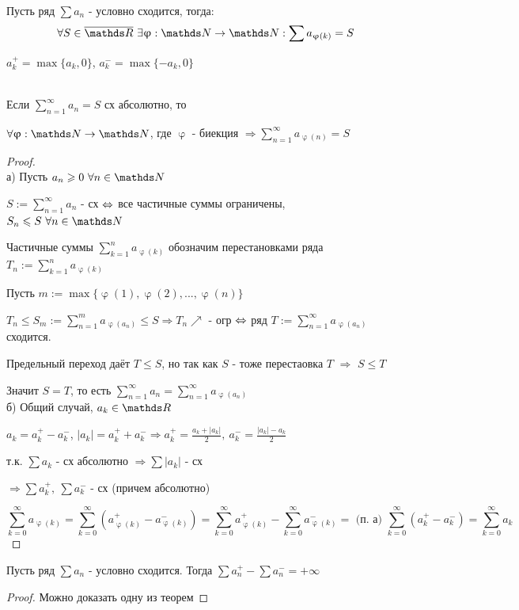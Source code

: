\documentclass[matan]{subfiles}
\begin{document}
  \begin{theorem} [Римана v1] \ \\
      Пусть ряд $\sum a_n$ - условно сходится, тогда:
      \[\forall S \in \overline{\R}\ \e \upvarphi: \N \rightarrow \N: \sum a_{\upvarphi(k)} = S\]
  \end{theorem}

  \begin{definition}
      $a_k^+ = \max\{a_k, 0\}$, $a_k^- = \max\{-a_k, 0\}$
  \end{definition}

  \begin{theorem}  \ \\
      Если $\sum\limits_{n=1}^\infty a_n= S$ сх абсолютно, то

      $\forall \upvarphi: \N \rightarrow \N$, где $\upvarphi$ - биекция $\Rightarrow \sum\limits_{n=1}^\infty a_{\upvarphi(n)} = S$
  \end{theorem}

  \begin{proof}\\
      а) Пусть $a_n \geqslant 0\ \forall n \in \N$

      $S := \sum\limits_{n=1}^\infty a_n$ - сх $\Leftrightarrow$ все частичные суммы ограничены,  $S_n \leqslant S\ \forall n \in \N$

      Частичные суммы $\sum\limits_{k=1}^n a_{\upvarphi(k)}$ обозначим перестановками ряда $T_n := \sum\limits_{k=1}^n a_{\upvarphi(k)}$

      Пусть $m:=\max \{\upvarphi(1), \upvarphi(2), ..., \upvarphi(n) \}$

      $T_n \leqslant S_m := \sum\limits_{n=1}^m a_{\upvarphi(a_n)} \leqslant S \Rightarrow T_n \nearrow$ - огр $\Leftrightarrow$ ряд $T := \sum\limits_{n=1}^\infty a_{\upvarphi(a_n)}$ сходится.

      Предельный переход даёт $T \leqslant S$, но так как $S$ - тоже перестаовка $T$ $\Rightarrow$ $S \leqslant T$

      Значит $S=T$, то есть $\sum\limits_{n=1}^\infty a_n = \sum\limits_{n=1}^\infty a_{\upvarphi(a_n)}$
      \\
      б) Общий случай, $a_k \in \R $

      $a_k = a_k^+ - a_k^-$, $|a_k| = a_k^+ + a_k^- \Rightarrow a_k^+ = \frac{a_k + |a_k|}{2},\ a_k^-=\frac{|a_k|-a_k}{2}$

      т.к. $\sum a_k$ - сх абсолютно $\Rightarrow \sum |a_k|$ - сх

      $\Rightarrow \sum a_k^+,\ \sum a_k^-$ - сх (причем абсолютно)

      $$\sum\limits_{k=0}^\infty a_{\upvarphi(k)} = \sum\limits_{k=0}^\infty (a_{\upvarphi(k)}^+ - a_{\upvarphi(k)}^-) = \sum\limits_{k=0}^\infty a_{\upvarphi(k)}^+ - \sum\limits_{k=0}^\infty a_{\upvarphi(k)}^- =\text{ (п. а) }\sum\limits_{k=0}^\infty (a_k^+ - a_k^-) = \sum\limits_{k=0}^\infty a_k$$
  \end{proof}

  \begin{theorem} [Римана v2]
      Пусть ряд $\sum a_n$ - условно сходится. Тогда $\sum a_n^+ - \sum a_n^- = + \infty$
  \end{theorem}

  \begin{proof}
      Можно доказать одну из теорем
  \end{proof}
\end{document}
